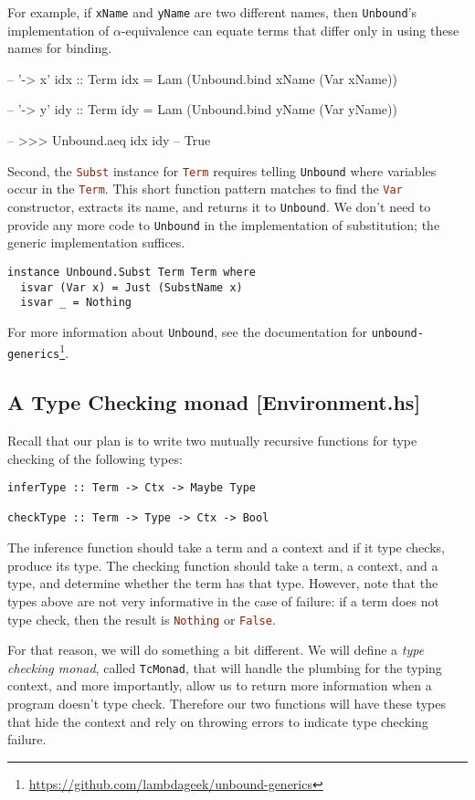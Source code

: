 \documentclass{article}
\newcommand\cd[1]{\lstinline[language=Haskell]{#1}}
\newcommand\unbound{\texttt{Unbound}\xspace}
\theoremstyle{definition}
\begin{document}
For example, if \cd{xName} and \cd{yName} are two different names, then
\unbound's implementation of $\alpha$-equivalence can equate terms that
differ only in using these names for binding.
\begin{piforall}
-- '\x -> x'
idx :: Term
idx = Lam (Unbound.bind xName (Var xName))

-- '\y -> y'
idy :: Term
idy = Lam (Unbound.bind yName (Var yName))

-- >>> Unbound.aeq idx idy
-- True
\end{piforall}

Second, the \cd{Subst} instance for \cd{Term} requires telling \unbound where
variables occur in the \cd{Term}. This short function pattern matches to find
the \cd{Var} constructor, extracts its name, and returns it to \unbound. We
don't need to provide any more code to \unbound in the implementation of
substitution; the generic implementation suffices.

\begin{verbatim}
instance Unbound.Subst Term Term where
  isvar (Var x) = Just (SubstName x)
  isvar _ = Nothing
\end{verbatim}

\noindent
For more information about \unbound, see the documentation for
\texttt{unbound-generics}\footnote{\url{https://github.com/lambdageek/unbound-generics}}.

\subsection{A Type Checking monad {[}Environment.hs{]}}

Recall that our plan is to write two mutually recursive functions for
type checking of the following types:

\begin{verbatim}
inferType :: Term -> Ctx -> Maybe Type

checkType :: Term -> Type -> Ctx -> Bool
\end{verbatim}

The inference function should take a term and a context and if it type checks,
produce its type. The checking function should take a term, a context, and a
type, and determine whether the term has that type. However, note that the
types above are not very informative in the case of failure: if a term does
not type check, then the result is \cd{Nothing} or \cd{False}.

For that reason, we will do something a bit different. We will define a \emph{type
  checking monad}, called \texttt{TcMonad}, that will handle the plumbing for
the typing context, and more importantly, allow us to return more information
when a program doesn't type check. Therefore our two functions will have these
types that hide the context and rely on throwing errors to indicate type
checking failure.
\end{document}
